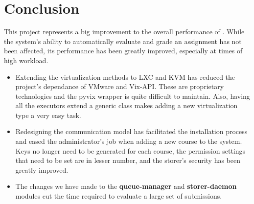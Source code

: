 \chapter{Conclusion}
\label{chapter:virt-concl}

This project represents a big improvement to the overall performance of \project.
While the system's ability to automatically evaluate and grade an assignment
has not been affected, its performance has been greatly improved, 
especially at times of high workload.


\begin{itemize}
\item Extending the virtualization methods to LXC and KVM has reduced the project's 
dependance of VMware and Vix-API. These are proprietary technologies and 
the pyvix wrapper is quite difficult to maintain. Also, having all the
executors extend a generic class makes adding a new virtualization type 
a very easy task.

\item Redesigning the communication model has facilitated the installation process
and eased the administrator's job when adding a new course to the system. 
Keys no longer need to be generated for each course, the permission settings
that need to be set are in lesser number, and the storer's security has been
greatly improved.

\item The changes we have made to the {\bf queue-manager} and
{\bf storer-daemon} modules cut the time required to evaluate a large
set of submissions. 
\end{itemize}
